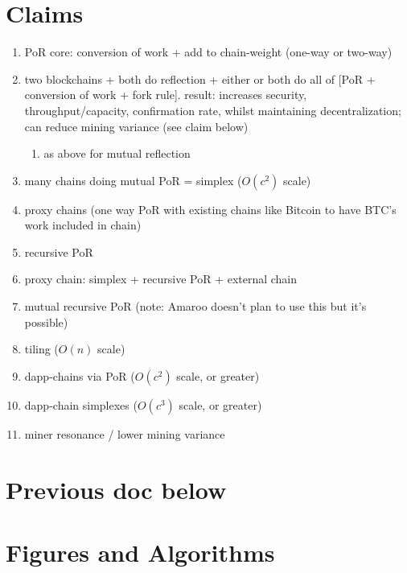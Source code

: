 \documentclass[a4paper,]{article}
\begin{document}

\section{Claims}

\begin{enumerate}
  \item PoR core: conversion of work + add to chain-weight (one-way or two-way)
  \item two blockchains + both do reflection + either or both do all of [PoR + conversion of work + fork rule]. result: increases security, throughput/capacity, confirmation rate, whilst maintaining decentralization; can reduce mining variance (see claim below)
  \begin{enumerate}
    \item as above for mutual reflection
  \end{enumerate}
  \item many chains doing mutual PoR = simplex ($O(c^2)$ scale)
  \item proxy chains (one way PoR with existing chains like Bitcoin to have BTC's work included in chain)
  \item recursive PoR
  \item proxy chain: simplex + recursive PoR + external chain
  \item mutual recursive PoR (note: Amaroo doesn't plan to use this but it's possible)
  \item tiling ($O(n)$ scale)
  \item dapp-chains via PoR ($O(c^2)$ scale, or greater)
  \item dapp-chain simplexes ($O(c^3)$ scale, or greater)
  \item miner resonance / lower mining variance
\end{enumerate}

\section{Previous doc below}




\newpage

\section{Figures and Algorithms} %
\end{document}
